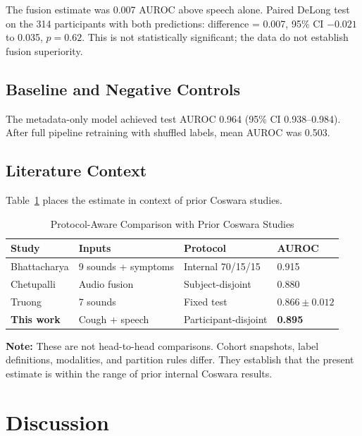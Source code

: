 \documentclass[conference]{IEEEtran}
\begin{document}
The fusion estimate was 0.007 AUROC above speech alone. Paired DeLong test on the 314 participants with both predictions: difference = 0.007, 95\% CI $-0.021$ to 0.035, $p=0.62$. This is not statistically significant; the data do not establish fusion superiority.

\subsection{Baseline and Negative Controls}

The metadata-only model achieved test AUROC 0.964 (95\% CI 0.938--0.984). After full pipeline retraining with shuffled labels, mean AUROC was 0.503.

\subsection{Literature Context}

Table~\ref{tab:context} places the estimate in context of prior Coswara studies.

\begin{table}[!t]
\caption{Protocol-Aware Comparison with Prior Coswara Studies}
\label{tab:context}
\centering
\footnotesize
\setlength{\tabcolsep}{2.5pt}
\begin{tabular}{llll}
\toprule
Study & Inputs & Protocol & AUROC \\
\midrule
Bhattacharya \cite{bhattacharya2023coswara} & 9 sounds + symptoms & Internal 70/15/15 & 0.915 \\
Chetupalli \cite{chetupalli2023multimodal} & Audio fusion & Subject-disjoint & 0.880 \\
Truong \cite{truong2024fair} & 7 sounds & Fixed test & $0.866 \pm 0.012$ \\
\midrule
\textbf{This work} & Cough + speech & Participant-disjoint & \textbf{0.895} \\
\bottomrule
\end{tabular}
\par\vspace{2pt}\scriptsize 
\textbf{Note:} These are not head-to-head comparisons. Cohort snapshots, label definitions, modalities, and partition rules differ. They establish that the present estimate is within the range of prior internal Coswara results.
\end{table}

\section{Discussion}
\end{document}
